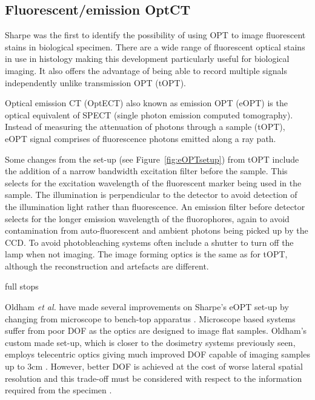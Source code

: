 \documentclass[12pt]{article}
\begin{document}
\subsection{Fluorescent/emission  OptCT}
\label{subsec:eOPT}

Sharpe was the first to identify the possibility of using OPT to image fluorescent stains in biological specimen. \cite{Sharpe:2002jp} There are a wide range of fluorescent optical stains in use in histology making this development particularly useful for biological imaging. It also offers the advantage of being able to record multiple signals independently unlike  transmission OPT (tOPT). \cite{Sharpe:2002jp} 


Optical emission CT (OptECT) also known as emission OPT (eOPT) is the optical equivalent of SPECT (single photon emission computed tomography). \cite{Oldham:2007ku}  Instead of measuring the attenuation of photons through a sample (tOPT), eOPT signal comprises of fluorescence photons emitted along a ray path. \cite{Walls:2005ja}



Some changes from the set-up (see Figure~\ref{fig:eOPTsetup}) from tOPT  include the addition of a narrow bandwidth excitation filter before the sample. This selects for the excitation wavelength of the fluorescent marker being used in the sample. The illumination is perpendicular to the detector to avoid detection of the illumination light rather than fluorescence. An emission filter before detector selects for the longer emission wavelength of the fluorophores, again to avoid contamination from auto-fluorescent and ambient photons being picked up by the CCD. To avoid photobleaching systems often include a shutter to turn off the lamp when not imaging.  The image forming optics is the same as for tOPT, although the reconstruction and artefacts are different. \cite{Walls:2005ja}

full stops

Oldham \textit{et al.} have made several improvements  on Sharpe's eOPT set-up by changing from microscope to bench-top apparatus \cite{Oldham:2006, Oldham:2007ku}. Microscope based systems suffer from poor DOF as the optics are designed to image flat samples.  Oldham's custom made set-up, which is closer to the dosimetry systems previously seen, employs telecentric optics giving much improved DOF capable of imaging samples up to 3cm \cite{Oldham:2007ku}. However, better DOF is achieved at the cost of worse lateral spatial resolution and this trade-off must be considered with respect to the information required from the specimen \cite{Krstajic:2006kna}.   
\end{document}
